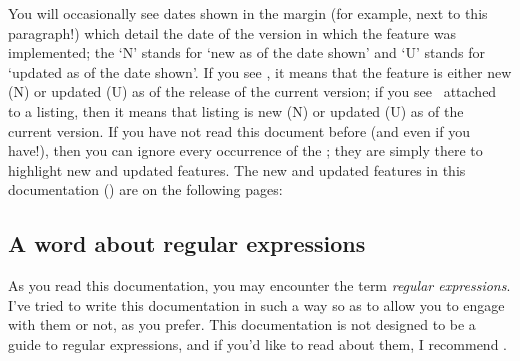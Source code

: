  You will occasionally see dates shown in the margin (for example, next to this
 paragraph!)  which detail the date of the version in
 which the feature was implemented; the `N' stands for `new as of the date shown' and `U'
 stands for `updated as of the date shown'. If you see \stardemo, it means that the
 feature is either new (N) or updated (U) as of the release of the current version; if
 you see \stardemo\, attached to a listing, then it means that listing is new (N) or
 updated (U) as of the current version. If you have not read this document before (and
 even if you have!), then you can ignore every occurrence of the \stardemo; they are
 simply there to highlight new and updated features. The new and updated features in this
 documentation (\gitRel) are on the following pages: \listOfNewFeatures%

\subsection{A word about regular expressions}
 As you read this documentation, you may encounter the term \emph{regular expressions}.
 I've tried to write this documentation in such a way so as to allow you to engage with
 them or not, as you prefer. This documentation is not designed to be a guide to regular
 expressions, and if you'd like to read about them, I recommend \cite{masteringregexp}.
